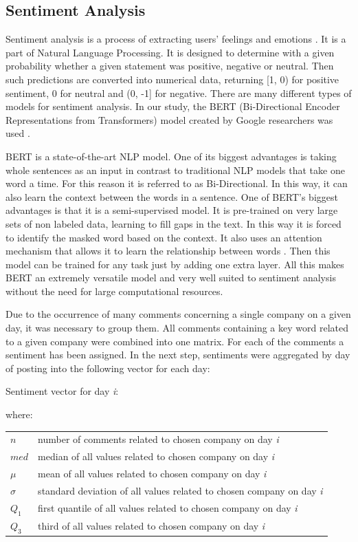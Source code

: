\documentclass[11pt]{article} %
\makeatletter
\newenvironment{conditions}
  {\par\vspace{\abovedisplayskip}\noindent\begin{tabular}{>{$}l<{$} @{${}={}$} l}}
  {\end{tabular}\par\vspace{\belowdisplayskip}}
\makeatother
\begin{document}
\subsection{Sentiment Analysis}
Sentiment analysis is a process of extracting users' feelings and emotions \cite{sentiment}. It is a part of Natural Language Processing. It is designed to determine with a given probability whether a given statement was positive, negative or neutral. Then such predictions are converted into numerical data, returning [1, 0) for positive sentiment, 0 for neutral and (0, -1] for negative. There are many different types of models for sentiment analysis. In our study, the BERT (Bi-Directional Encoder Representations from Transformers) model created by Google researchers was used \cite{bert}. 

BERT is a state-of-the-art NLP model. One of its biggest advantages is taking whole sentences as an input in contrast to traditional NLP models that take one word a time. For this reason it is referred to as Bi-Directional. In this way, it can also learn the context between the words in a sentence. One of BERT's biggest advantages is that it is a semi-supervised model. It is pre-trained on very large sets of non labeled data, learning to fill gaps in the text. In this way it is forced to identify the masked word based on the context. It also uses an attention mechanism that allows it to learn the relationship between words \cite{bert}. Then this model can be trained for any task just by adding one extra layer.  All this makes BERT an extremely versatile model and very well suited to sentiment analysis without the need for large computational resources. 


Due to the occurrence of many comments concerning a single company on a given day, it was necessary to group them. All comments containing a key word related to a given company were combined into one matrix. For each of the comments a sentiment has been assigned. In the next step, sentiments were aggregated by day of posting into the following vector for each day: 
\begin{center}   Sentiment vector for day \emph{i}:\end{center}
\begin{equation} [n, \mu, \sigma, med, Q_1, Q_3] \end{equation}
where:
\begin{conditions}
 n     &  number of comments related to chosen company on day \emph{i}\\
 med     &  median of all values related to chosen company on day \emph{i} \\  
\mu    &  mean of all values related to chosen company on day \emph{i} \\    
\sigma    &  standard deviation of all values related to chosen company on day \emph{i} \\   
Q_1     &  first quantile of all values related to chosen company on day \emph{i} \\   
Q_3     &  third of all values related to chosen company on day \emph{i} \\   
\end{conditions}
\end{document}
